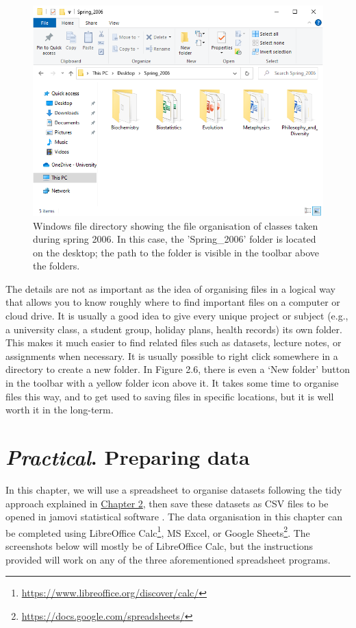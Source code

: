 \documentclass[
  openany]{krantz}
\renewcommand{\href}[2]{#2\footnote{\url{#1}}}
\begin{document}
\begin{figure}
\includegraphics[width=1\linewidth]{img/directory_windows} \caption{Windows file directory showing the file organisation of classes taken during spring 2006. In this case, the 'Spring\_2006' folder is located on the desktop; the path to the folder is visible in the toolbar above the folders.}\label{fig:unnamed-chunk-8}
\end{figure}

The details are not as important as the idea of organising files in a logical way that allows you to know roughly where to find important files on a computer or cloud drive.
It is usually a good idea to give every unique project or subject (e.g., a university class, a student group, holiday plans, health records) its own folder.
This makes it much easier to find related files such as datasets, lecture notes, or assignments when necessary.
It is usually possible to right click somewhere in a directory to create a new folder.
In Figure 2.6, there is even a `New folder' button in the toolbar with a yellow folder icon above it.
It takes some time to organise files this way, and to get used to saving files in specific locations, but it is well worth it in the long-term.

\hypertarget{Chapter_3}{%
\chapter{\texorpdfstring{\emph{Practical}. Preparing data}{Practical. Preparing data}}\label{Chapter_3}}

In this chapter, we will use a spreadsheet to organise datasets following the tidy approach explained in \protect\hyperlink{Chapter_2}{Chapter 2}, then save these datasets as CSV files to be opened in jamovi statistical software \citep{Jamovi2022}.
The data organisation in this chapter can be completed using \href{https://www.libreoffice.org/discover/calc/}{LibreOffice Calc}, MS Excel, or \href{https://docs.google.com/spreadsheets/}{Google Sheets}.
The screenshots below will mostly be of LibreOffice Calc, but the instructions provided will work on any of the three aforementioned spreadsheet programs.
\end{document}
